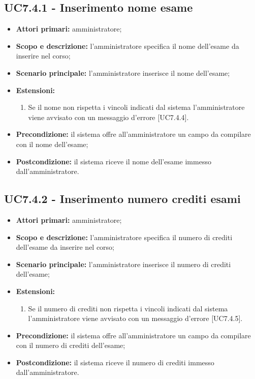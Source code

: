 \documentclass[AnalisiDeiRequisiti.tex]{subfiles}
\begin{document}
\subsection{UC7.4.1 - Inserimento nome esame}
\begin{itemize}
	\item \textbf{Attori primari:} amministratore;
	\item \textbf{Scopo e descrizione:} l'amministratore specifica il nome dell'esame da inserire nel corso;
	\item \textbf{Scenario principale:} l'amministratore inserisce il nome dell'esame;
	\item \textbf{Estensioni:}
	\begin{enumerate}
		\item Se il nome non rispetta i vincoli indicati dal sistema l'amministratore viene avvisato con un messaggio d'errore [UC7.4.4].
	\end{enumerate}
	\item \textbf{Precondizione:} il sistema offre all'amministratore un campo da compilare con il nome dell'esame; 
	\item \textbf{Postcondizione:} il sistema riceve il nome dell'esame immesso dall'amministratore.
\end{itemize}
\subsection{UC7.4.2 - Inserimento numero crediti esami}
\begin{itemize}
	\item \textbf{Attori primari:} amministratore;
	\item \textbf{Scopo e descrizione:} l'amministratore specifica il numero di crediti dell'esame da inserire nel corso;
	\item \textbf{Scenario principale:} l'amministratore inserisce il numero di crediti dell'esame;
	\item \textbf{Estensioni:}
	\begin{enumerate}
		\item Se il numero di crediti non rispetta i vincoli indicati dal sistema l'amministratore viene avvisato con un messaggio d'errore [UC7.4.5].
	\end{enumerate}
	\item \textbf{Precondizione:} il sistema offre all'amministratore un campo da compilare con il numero di crediti dell'esame; 
	\item \textbf{Postcondizione:} il sistema riceve il numero di crediti immesso dall'amministratore.
\end{itemize}
\end{document}
